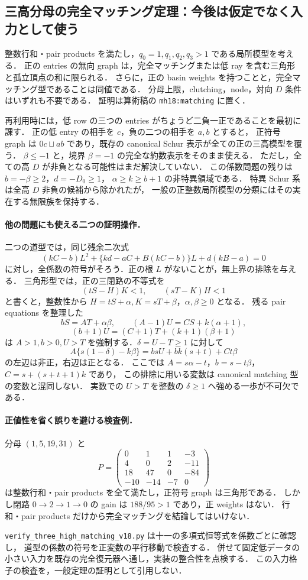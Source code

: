 \subsection{三高分母の完全マッチング定理：今後は仮定でなく入力として使う}
\label{nm18:matching}

整数行和・pair products を満たし，$q_0=1,q_1,q_2,q_3>1$ である局所模型を考える．
正の entries の無向 graph は，完全マッチングまたは低 ray を含む三角形と孤立頂点の和に限られる．
さらに，正の basin weights を持つことと，完全マッチング型であることは同値である．
分母上限，clutching，node，対向 $D$ 条件はいずれも不要である．
証明は算術稿の \texttt{mh18:matching} に置く．

再利用時には，低 row の三つの entries がちょうど二負一正であることを最初に課す．
正の低 entry の相手を $c$，負の二つの相手を $a,b$ とすると，
正符号 graph は $0c\sqcup ab$ であり，既存の canonical Schur 表示が全ての正の三高模型を覆う．
$\beta\le-1$ と，境界 $\beta=-1$ の完全な約数表示をそのまま使える．
ただし，全ての高 $D$ が非負となる可能性はまだ解決していない．
この係数問題の残りは $b=-\beta\ge2$，$d=-D_0\ge1$，
$\alpha\ge k\ge b+1$ の非特異領域である．
特異 Schur 系は全高 $D$ 非負の候補から除かれたが，
一般の正整数局所模型の分類にはその実在する無限族を保持する．

\paragraph{他の問題にも使える二つの証明操作．}
二つの道型では，同じ残余二次式
\[
 (kC-b)L^2+\{kd-aC+B(kC-b)\}L+d(kB-a)=0
\]
に対し，全係数の符号がそろう．正の根 $L$ がないことが，無上界の排除を与える．
三角形型では，正の三閉路の不等式を
\[
 (tS-H)K<1,\qquad (sT-K)H<1
\]
と書くと，整数性から $H=tS+\alpha,K=sT+\beta$，$\alpha,\beta\ge0$ となる．
残る pair equations を整理した
\[
 bS=AT+\alpha\beta,\qquad
 (A-1)U=CS+k(\alpha+1),
\]
\[
 (b+1)U=(C+1)T+(k+1)(\beta+1)
\]
は $A>1,b>0,U>T$ を強制する．$\delta=U-T\ge1$ に対して
\[
 A\{s(1-\delta)-k\beta\}=bsU+bk(s+t)+Ct\beta
\]
の左辺は非正，右辺は正となる．
ここでは $A=s\alpha-t$，$b=s-t\beta$，$C=s+(s+t+1)k$ であり，
この排除に用いる変数は canonical matching 型の変数と混同しない．
実数での $U>T$ を整数の $\delta\ge1$ へ強める一歩が不可欠である．

\paragraph{正値性を省く誤りを避ける検査例．}
分母 $(1,5,19,31)$ と
\[
 P=\begin{pmatrix}
 0&1&1&-3\\4&0&2&-11\\18&47&0&-84\\-10&-14&-7&0
 \end{pmatrix}
\]
は整数行和・pair products を全て満たし，正符号 graph は三角形である．
しかし閉路 $0\to2\to1\to0$ の gain は $188/95>1$ であり，正 weights はない．
行和・pair products だけから完全マッチングを結論してはいけない．

\nolinkurl{verify_three_high_matching_v18.py} は十一の多項式恒等式を係数ごとに確認し，
道型の係数の符号を正変数の平行移動で検査する．
併せて固定低データの小さい入力を既存の完全復元器へ通し，実装の整合性を点検する．
この入力格子の検査を，一般定理の証明として引用しない．
